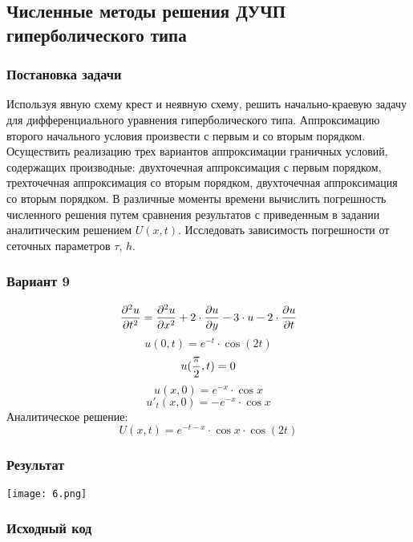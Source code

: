 \graphicspath{{images/}}

\subsection{Численные методы решения ДУЧП гиперболического типа}

\subsubsection{Постановка задачи}
Используя явную схему крест и неявную схему, решить начально-краевую задачу для дифференциального уравнения гиперболического типа. Аппроксимацию второго начального условия произвести с первым и со вторым порядком. Осуществить реализацию трех вариантов аппроксимации граничных условий, содержащих производные: двухточечная аппроксимация с первым порядком, трехточечная аппроксимация со вторым порядком, двухточечная аппроксимация со вторым порядком. В различные моменты времени вычислить погрешность численного решения путем сравнения результатов с приведенным в задании аналитическим решением $U(x, t)$. Исследовать зависимость погрешности от сеточных параметров $\tau$, $h$.

\subsubsection{Вариант 9}
$$ {{\partial^2 u} \over {\partial t^2}} = {{\partial^2 u} \over {\partial x^2}} + 2 \cdot {{\partial u} \over {\partial y}} - 3 \cdot u - 2 \cdot {{\partial u} \over {\partial t}} $$
$$ u(0, t) = e ^ {-t} \cdot \cos(2t) $$
$$ u({{\pi} \over {2}}, t) = 0 $$
$$ u(x, 0) = e ^ {-x} \cdot \cos{x} $$
$$ u'_t(x, 0) = -e ^ {-x} \cdot \cos{x} $$
Аналитическое решение:
$$ U(x, t) = e ^ {-t-x} \cdot \cos{x} \cdot \cos(2t) $$
\pagebreak

\subsubsection{Результат}
\begin{center}
    \texttt{[image: 6.png]}\newline\noindent
\end{center}
\pagebreak

\subsubsection{Исходный код}

\pagebreak
